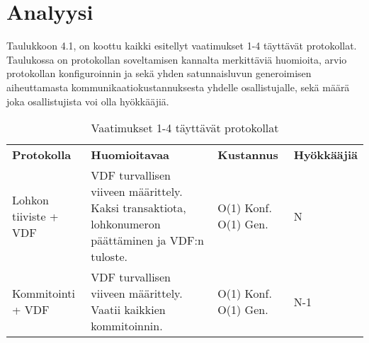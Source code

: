\chapter{Analyysi\label{discussion}}



Taulukkoon 4.1, on koottu kaikki esitellyt vaatimukset 1-4 täyttävät protokollat. Taulukossa on protokollan soveltamisen kannalta merkittäviä huomioita, arvio protokollan konfiguroinnin ja sekä yhden satunnaisluvun generoimisen aiheuttamasta kommunikaatiokustannuksesta yhdelle osallistujalle, sekä määrä joka osallistujista voi olla hyökkääjiä.

\begin{table}[h]
    \caption{Vaatimukset 1-4 täyttävät protokollat}
    \label{crouch}
    \begin{tabular}{  l  p{5cm}  p{4cm} p{2cm} }
        \toprule
\textbf{Protokolla}      
& \textbf{Huomioitavaa}
& \textbf{Kustannus}
& \textbf{Hyökkääjiä} \\
Lohkon tiiviste + VDF 
& VDF turvallisen viiveen määrittely. Kaksi transaktiota, lohkonumeron päättäminen ja VDF:n tuloste.
& O(1) Konf. O(1) Gen.
& N \\\hline
Kommitointi + VDF       
& VDF turvallisen viiveen määrittely. Vaatii kaikkien kommitoinnin.                   
&  O(1) Konf. O(1) Gen.
& N-1  \\\hline
        \bottomrule
    \end{tabular}
\end{table}

